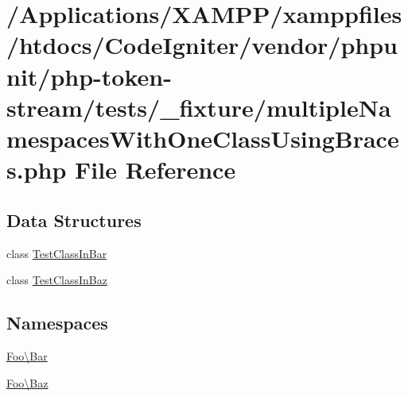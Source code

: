 \hypertarget{multiple_namespaces_with_one_class_using_braces_8php}{}\section{/\+Applications/\+X\+A\+M\+P\+P/xamppfiles/htdocs/\+Code\+Igniter/vendor/phpunit/php-\/token-\/stream/tests/\+\_\+fixture/multiple\+Namespaces\+With\+One\+Class\+Using\+Braces.php File Reference}
\label{multiple_namespaces_with_one_class_using_braces_8php}
\subsection*{Data Structures}
\begin{DoxyCompactItemize}
\item 
class \mbox{\hyperlink{class_foo_1_1_bar_1_1_test_class_in_bar}{Test\+Class\+In\+Bar}}
\item 
class \mbox{\hyperlink{class_foo_1_1_baz_1_1_test_class_in_baz}{Test\+Class\+In\+Baz}}
\end{DoxyCompactItemize}
\subsection*{Namespaces}
\begin{DoxyCompactItemize}
\item 
 \mbox{\hyperlink{namespace_foo_1_1_bar}{Foo\textbackslash{}\+Bar}}
\item 
 \mbox{\hyperlink{namespace_foo_1_1_baz}{Foo\textbackslash{}\+Baz}}
\end{DoxyCompactItemize}
